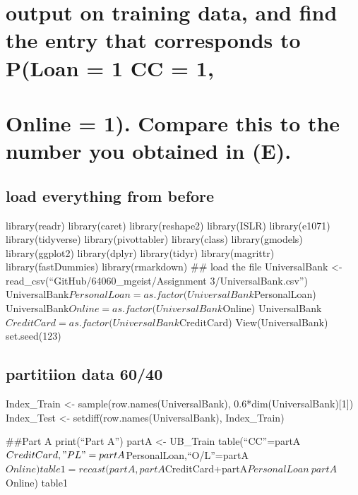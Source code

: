 \documentclass[
]{article}
\begin{document}
\hypertarget{output-on-training-data-and-find-the-entry-that-corresponds-to-ploan-1-cc-1}{%
\section{output on training data, and find the entry that corresponds to
P(Loan = 1 \textbar{} CC =
1,}\label{output-on-training-data-and-find-the-entry-that-corresponds-to-ploan-1-cc-1}}

\hypertarget{online-1.-compare-this-to-the-number-you-obtained-in-e.}{%
\section{Online = 1). Compare this to the number you obtained in
(E).}\label{online-1.-compare-this-to-the-number-you-obtained-in-e.}}

\hypertarget{load-everything-from-before}{%
\subsection{load everything from
before}\label{load-everything-from-before}}

library(readr) library(caret) library(reshape2) library(ISLR)
library(e1071) library(tidyverse) library(pivottabler) library(class)
library(gmodels) library(ggplot2) library(dplyr) library(tidyr)
library(magrittr) library(fastDummies) library(rmarkdown) \#\# load the
file UniversalBank \textless-
read\_csv(``GitHub/64060\_mgeist/Assignment 3/UniversalBank.csv'')
UniversalBank\(PersonalLoan = as.factor(UniversalBank\)PersonalLoan)
UniversalBank\(Online = as.factor(UniversalBank\)Online)
UniversalBank\(CreditCard = as.factor(UniversalBank\)CreditCard)
View(UniversalBank) set.seed(123)

\hypertarget{partitiion-data-6040}{%
\subsection{partitiion data 60/40}\label{partitiion-data-6040}}

Index\_Train \textless- sample(row.names(UniversalBank),
0.6*dim(UniversalBank){[}1{]})\\
Index\_Test \textless- setdiff(row.names(UniversalBank), Index\_Train)

\#\#Part A print(``Part A'') partA \textless- UB\_Train
table(``CC''=partA\(CreditCard,"PL"=partA\)PersonalLoan,``O/L''=partA\(Online) table1 = recast(partA,partA\)CreditCard+partA\(PersonalLoan~partA\)Online)
table1
\end{document}
